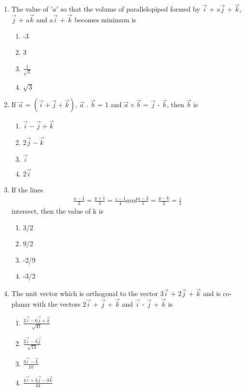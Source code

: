 \begin{enumerate}[label=\arabic*.,ref=\thesubsection.\theenumi]
\item The value of $'a'$ so that the volume of parallelopiped formed by $\overrightarrow{i}$ + a$\overrightarrow{j}$ + $\overrightarrow{k}$, $\overrightarrow{j}$ + a$\overrightarrow{k}$ and a$\overrightarrow{i}$ + $\overrightarrow{k}$ becomes minimum is
\begin{enumerate}
\item -3
\item 3
\item $\frac{1}{\sqrt{3}}$
\item $\sqrt{3}$
\end{enumerate}

\item If $\overrightarrow{a}$ = $(\overrightarrow{i} + \overrightarrow{j} + \overrightarrow{k})$, $\overrightarrow{a}$ . $\overrightarrow{b}$ = 1 and $\overrightarrow{a} \times \overrightarrow{b}$ = 
$\overrightarrow{j}$ - $\overrightarrow{k}$, then $\overrightarrow{b}$ is
\begin{enumerate}
\item $\overrightarrow{i} - \overrightarrow{j} + \overrightarrow{k}$
\item 2$\overrightarrow{j} - \overrightarrow{k}$
\item $\overrightarrow{i}$
\item 2$\overrightarrow{i}$
\end{enumerate}

\item If the lines 
\begin{align*}
\frac{x - 1}{2} = \frac{y + 1}{3} = \frac{z - 1}{4} and \frac{x - 3}{1} = \frac{y - k}{2} = \frac{z}{1}
\end{align*}
intersect, then the value of k is
\begin{enumerate}
\item 3/2
\item 9/2
\item -2/9
\item -3/2
\end{enumerate}

\item The unit vector which is orthogonal to the vector 3$\overrightarrow{i}$ + 2$\overrightarrow{j}$ + $\overrightarrow{k}$ and is co-planar with the vectors 2$\overrightarrow{i}$ + $\overrightarrow{j}$ + $\overrightarrow{k}$ and $\overrightarrow{i}$ - $\overrightarrow{j}$ + $\overrightarrow{k}$ is
\begin{enumerate}
\item $\frac{2\overrightarrow{i} - 6\overrightarrow{j} + \overrightarrow{k}}{\sqrt{41}}$
\item $\frac{2\overrightarrow{i} - 3\overrightarrow{j}}{\sqrt{13}}$
\item $\frac{3\overrightarrow{i} - \overrightarrow{k}}{10}$
\item $\frac{4\overrightarrow{i} + 3\overrightarrow{j} - 3\overrightarrow{k}}{34}$
\end{enumerate}


\end{enumerate}
